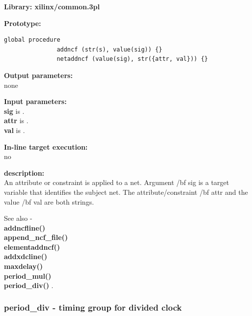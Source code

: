             {\bf Library: xilinx/common.3pl}

            {\bf Prototype:} \\
            \vsp
            \begin{lstlisting}[gobble=12, language=threepl]
               global procedure
               addncf (str(s), value(sig)) {}
               netaddncf (value(sig), str({attr, val})) {}
            \end{lstlisting}

            {\bf Output parameters:} \\
            none

            {\bf Input parameters:} \\            
            {\bf sig} is .\\
            {\bf attr} is .\\
            {\bf val} is .
        
            {\bf In-line target execution:} \\
            no

            {\bf description:} \\
            An attribute or constraint is applied to a net. Argument
            {/bf sig} is a target variable that identifies the subject net. The
            attribute/constraint {/bf attr} and the value {/bf val} are both
            strings.
            
            See also - \\
            {\bf addncfline()} \\
            {\bf append\_ncf\_file()} \\
            {\bf elementaddncf()} \\
            {\bf addxdcline()} \\
            {\bf maxdelay()} \\
            {\bf period\_mul()} \\
            {\bf period\_div()} .









        \subsubsection{period\_div - timing group for divided clock}\label{sec:lpperioddiv}
            

